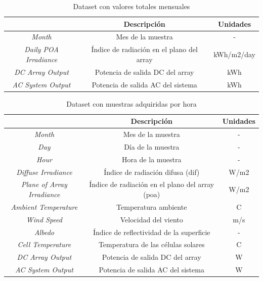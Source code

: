 \begin{table}[h!]
    \centering
    \begin{tabular}{|c|c|c|}
    \hline
    \rowcolor[HTML]{AAAAAA} 
    \multicolumn{1}{|c|}{\cellcolor[HTML]{AAAAAA}Campo} & \multicolumn{1}{c|}{\cellcolor[HTML]{AAAAAA}Descripción} & Unidades \\ \hline
    \textit{Month} & Mes de la muestra & - \\ \hline
    \textit{Daily POA Irradiance} & Índice de radiación en el plano del array & kWh/m2/day \\ \hline 
    \textit{DC Array Output} & Potencia de salida DC del array & kWh \\ \hline
    \textit{AC System Output} & Potencia de salida AC del sistema & kWh \\ \hline
    \end{tabular}
    \caption{Dataset con valores totales mensuales \cite{pvwatts}}
    \label{tab:pvwattsdataset2}
\end{table}

\vspace{3mm}

\begin{table}[h!]
    \centering
    \begin{tabular}{|c|c|c|}
    \hline
    \rowcolor[HTML]{AAAAAA} 
    \multicolumn{1}{|c|}{\cellcolor[HTML]{AAAAAA}Campo} & \multicolumn{1}{c|}{\cellcolor[HTML]{AAAAAA}Descripción} & Unidades \\ \hline
    \textit{Month} & Mes de la muestra & - \\ \hline
    \textit{Day} & Día de la muestra & - \\ \hline
    \textit{Hour} & Hora de la muestra & - \\ \hline
    \textit{Diffuse Irradiance} & Índice de radiación difusa (\gls{dif}) & W/m2 \\ \hline
    \textit{Plane of Array Irradiance} & Índice de radiación en el plano del array (\acrshort{poa}) & W/m2 \\ \hline 
    \textit{Ambient Temperature} & Temperatura ambiente & C \\ \hline
    \textit{Wind Speed} & Velocidad del viento & m/s \\ \hline
    \textit{Albedo} & Índice de reflectividad de la superficie & - \\ \hline
    \textit{Cell Temperature} & Temperatura de las células solares & C \\ \hline
    \textit{DC Array Output} & Potencia de salida DC del array & W \\ \hline
    \textit{AC System Output} & Potencia de salida AC del sistema & W \\ \hline
    \end{tabular}
    \caption{Dataset con muestras adquiridas por hora \cite{pvwatts}}
    \label{tab:pvwattsdataset}
\end{table}

